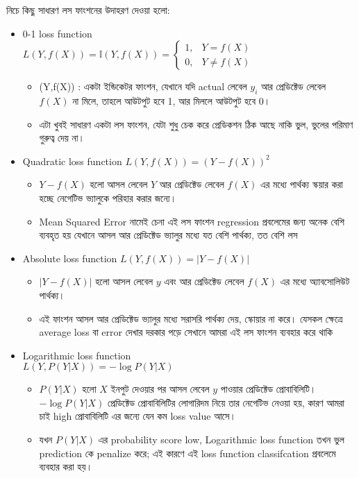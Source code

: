 \documentclass[graybox, envcountchap, twocolumn]{styles/svmult}
\newcommand\abs[1]{\left\lvert#1\right\rvert}
\begin{document}
নিচে কিছু সাধারণ লস ফাংশনের উদাহরণ দেওয়া হলো:
\begin{itemize}

\item 0-1 loss function \\ $L(Y,f(X))=\mathbb{I}(Y,f(X))=\begin{cases} 1, & Y=f(X) \\ 0, & Y \neq f(X) \end{cases}$ %

\begin{itemize}
    \item {}(Y,f(X)) : একটা ইন্ডিকেটর ফাংশন, যেখানে যদি actual লেবেল  $ y_i $  আর প্রেডিক্টেড লেবেল  $f(X)$  না মিলে, তাহলে আউটপুট হবে 1, আর মিললে আউটপুট হবে 0।
    \item এটা খুবই সাধারণ একটা লস ফাংশন, যেটা শুধু চেক করে প্রেডিকশন ঠিক আছে নাকি ভুল, ভুলের পরিমাণ গুরুত্ব দেয় না।
\end{itemize}

\item Quadratic loss function $L(Y,f(X))=\left(Y-f(X)\right)^2$ %
\begin{itemize}
    \item $Y−f(X)$ হলো আসল লেবেল $Y$ আর প্রেডিক্টেড লেবেল $f(X)$ এর মধ্যে পার্থক্য স্কয়ার করা হচ্ছে নেগেটিভ ভ্যালুকে পরিহার করার জন্যে। 
    \item Mean Squared Error নামেই চেনা এই লস ফাংশন regression প্রবলেমের জন্য অনেক বেশি ব্যবহৃত হয় যেখানে আসল আর প্রেডিক্টেড ভ্যালুর মধ্যে যত বেশি পার্থক্য, তত বেশি লস
\end{itemize}

\item Absolute loss function $L(Y,f(X))=\abs{Y-f(X)}$  %
\begin{itemize}
    \item $\abs{Y-f(X)}$  হলো আসল লেবেল $y$ এবং  আর প্রেডিক্টেড লেবেল $f(X)$ এর মধ্যে অ্যাবসোলিউট পার্থক্য।
    \item এই ফাংশন আসল আর প্রেডিক্টেড ভ্যালুর মধ্যে সরাসরি পার্থক্য দেয়, স্কোয়ার না করে। যেসকল ক্ষেত্রে average loss বা error দেখার দরকার পড়ে সেখানে আমরা এই লস ফাংশন ব্যবহার করে থাকি 
\end{itemize}
\item Logarithmic loss function \\ $L(Y,P(Y|X))=-\log{P(Y|X)}$ %
\begin{itemize}
    \item $P(Y|X)$  হলো $X$ ইনপুট দেওয়ার পর আসল লেবেল $y$ পাওয়ার প্রেডিক্টেড প্রোবাবিলিটি।  $-\log{P(Y|X)}$ প্রেডিক্টেড প্রোবাবিলিটির লোগারিদম নিয়ে তার নেগেটিভ নেওয়া হয়, কারণ আমরা চাই high প্রোবাবিলিটি এর জন্যে যেন কম loss value আসে। 
    \item যখন $P(Y|X)$ এর probability score low, Logarithmic loss function তখন ভুল prediction কে penalize করে; এই কারণে এই loss function classifcation প্রবলেমে ব্যবহার করা হয়। 
\end{itemize}

\end{itemize}
\end{document}
